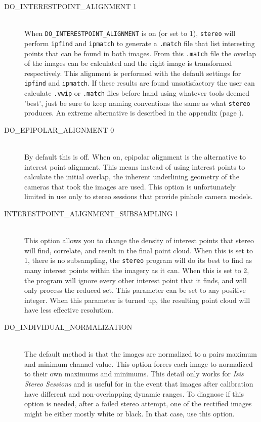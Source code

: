 \begin{description}
\item[DO\_INTERESTPOINT\_ALIGNMENT 1] \hfill \\ When
  \texttt{DO\_INTERESTPOINT\_ALIGNMENT} is on (or set to 1),
  \texttt{stereo} will perform \texttt{ipfind} and \texttt{ipmatch} to
  generate a \texttt{.match} file that list interesting points that
  can be found in both images. From this \texttt{.match} file the
  overlap of the images can be calculated and the right image is
  transformed respectively. This alignment is performed with the
  default settings for \texttt{ipfind} and \texttt{ipmatch}. If these
  results are found unsatisfactory the user can calculate
  \texttt{.vwip} or \texttt{.match} files before hand using whatever
  tools deemed 'best', just be sure to keep naming conventions the
  same as what \texttt{stereo} produces. An extreme alternative is
  described in the appendix (page \pageref{appendix_surf}).

\item[DO\_EPIPOLAR\_ALIGNMENT 0] \hfill \\ By default this is off.
  When on, epipolar alignment is the alternative to interest point
  alignment. This means instead of using interest points to calculate
  the initial overlap, the inherent underlining geometry of the
  cameras that took the images are used. This option is unfortunately
  limited in use only to stereo sessions that provide pinhole camera
  models.

\item[INTERESTPOINT\_ALIGNMENT\_SUBSAMPLING 1] \hfill \\
  This option allows you to change the density of interest points
  that stereo will find, correlate, and result in the final point
  cloud.  When this is set to 1, there is no subsampling, the
  \texttt{stereo} program will do its best to find as many interest
  points within the imagery as it can.  When this is set to 2, the
  program will ignore every other interest point that it finds, and
  will only process the reduced set.  This parameter can be set to
  any positive integer.  When this parameter is turned up, the resulting
  point cloud will have less effective resolution.

\item[DO\_INDIVIDUAL\_NORMALIZATION] \hfill \\ The default method is
  that the images are normalized to a pairs maximum and minimum
  channel value. This option forces each image to normalized to their
  own maximums and minimums. This detail only works for \emph{Isis
    Stereo Sessions} and is useful for in the event that images after
  calibration have different and non-overlapping dynamic ranges. To
  diagnose if this option is needed, after a failed stereo attempt,
  one of the rectified images might be either mostly white or
  black. In that case, use this option.


\end{description}
